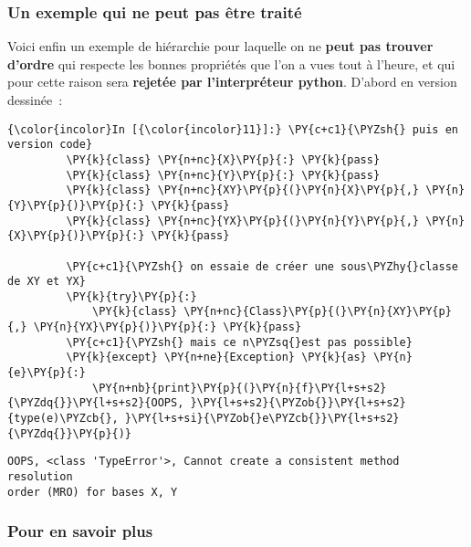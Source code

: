     \hypertarget{un-exemple-qui-ne-peut-pas-uxeatre-traituxe9}{%
\subsubsection{Un exemple qui ne peut pas être
traité}\label{un-exemple-qui-ne-peut-pas-uxeatre-traituxe9}}

    Voici enfin un exemple de hiérarchie pour laquelle on ne \textbf{peut
pas trouver d'ordre} qui respecte les bonnes propriétés que l'on a vues
tout à l'heure, et qui pour cette raison sera \textbf{rejetée par
l'interpréteur python}. D'abord en version dessinée~:

    \begin{Verbatim}[commandchars=\\\{\}]
{\color{incolor}In [{\color{incolor}11}]:} \PY{c+c1}{\PYZsh{} puis en version code}
         \PY{k}{class} \PY{n+nc}{X}\PY{p}{:} \PY{k}{pass}
         \PY{k}{class} \PY{n+nc}{Y}\PY{p}{:} \PY{k}{pass}
         \PY{k}{class} \PY{n+nc}{XY}\PY{p}{(}\PY{n}{X}\PY{p}{,} \PY{n}{Y}\PY{p}{)}\PY{p}{:} \PY{k}{pass}
         \PY{k}{class} \PY{n+nc}{YX}\PY{p}{(}\PY{n}{Y}\PY{p}{,} \PY{n}{X}\PY{p}{)}\PY{p}{:} \PY{k}{pass}
         
         \PY{c+c1}{\PYZsh{} on essaie de créer une sous\PYZhy{}classe de XY et YX}
         \PY{k}{try}\PY{p}{:}
             \PY{k}{class} \PY{n+nc}{Class}\PY{p}{(}\PY{n}{XY}\PY{p}{,} \PY{n}{YX}\PY{p}{)}\PY{p}{:} \PY{k}{pass} 
         \PY{c+c1}{\PYZsh{} mais ce n\PYZsq{}est pas possible}
         \PY{k}{except} \PY{n+ne}{Exception} \PY{k}{as} \PY{n}{e}\PY{p}{:}
             \PY{n+nb}{print}\PY{p}{(}\PY{n}{f}\PY{l+s+s2}{\PYZdq{}}\PY{l+s+s2}{OOPS, }\PY{l+s+s2}{\PYZob{}}\PY{l+s+s2}{type(e)\PYZcb{}, }\PY{l+s+si}{\PYZob{}e\PYZcb{}}\PY{l+s+s2}{\PYZdq{}}\PY{p}{)}
\end{Verbatim}


    \begin{Verbatim}[commandchars=\\\{\}]
OOPS, <class 'TypeError'>, Cannot create a consistent method resolution
order (MRO) for bases X, Y

    \end{Verbatim}

    \hypertarget{pour-en-savoir-plus}{%
\subsubsection{Pour en savoir plus}\label{pour-en-savoir-plus}}

